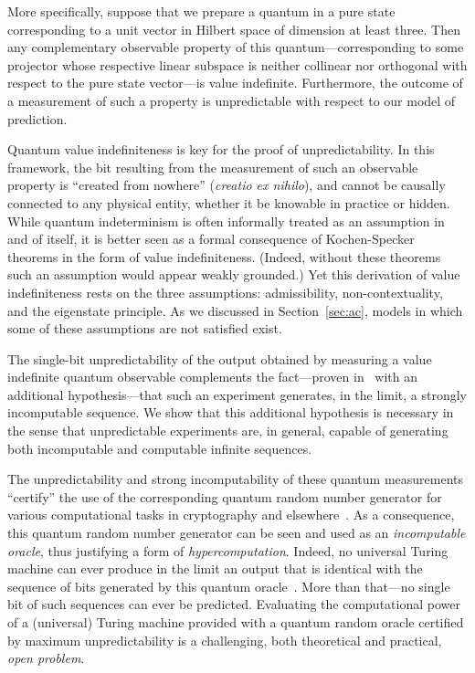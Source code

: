 \documentclass[%
 superscriptaddress,
 preprint,
 showpacs,
 showkeys,
 preprintnumbers,
 nofootinbib,
  amsmath,amssymb,
  aps,
 pra,
  longbibliography,
  floatfix,
 ]{revtex4-1}
\theoremstyle{definition}
\begin{document}
More specifically,  suppose that we prepare a quantum in a pure state corresponding to a unit vector in Hilbert space of dimension at least three.
Then any complementary observable property of this quantum---corresponding to some projector whose respective linear subspace is neither collinear nor orthogonal with respect to the pure state vector---is value indefinite.
Furthermore,  the outcome of a measurement of such a property is unpredictable with respect to our model of prediction.

Quantum value indefiniteness is key for the proof of unpredictability.
In this framework, the bit resulting from the measurement of such an observable property is ``created from nowhere'' (\emph{creatio ex nihilo}), and cannot be causally connected to any physical entity, whether it be knowable in practice or hidden.
While quantum indeterminism is often informally treated as an assumption in and of itself, it is better seen as a formal consequence of Kochen-Specker theorems in the form of value indefiniteness.
(Indeed, without these theorems such an assumption would appear weakly grounded.)
Yet this derivation of value indefiniteness rests on the three assumptions: admissibility, non-contextuality, and the eigenstate principle.
As we discussed in Section~\ref{sec:ac}, models in which some of these assumptions are not satisfied exist.

The single-bit unpredictability of the output obtained by measuring a value indefinite quantum observable 
complements the fact---proven in~\cite{2012-incomput-proofsCJ} with an additional hypothesis---that such an experiment generates, in the limit, a strongly incomputable sequence.
We show that this additional hypothesis is necessary in the sense that unpredictable experiments are, in general, capable of generating both incomputable and computable infinite sequences.


The unpredictability and strong incomputability of these quantum measurements ``certify'' the use of the corresponding quantum random number generator for various computational tasks in cryptography and elsewhere~\cite{svozil-qct,stefanov-2000,10.1038/nature09008}. As a consequence, this quantum random number generator can be seen and used as an \emph{incomputable oracle}, thus  justifying   a form of  \emph{hypercomputation}. Indeed,  no universal Turing machine can ever produce in the limit an output that is identical with the sequence of bits generated by this quantum oracle~\cite{qrand-oracle}.
More than that---no single bit of such sequences can ever be predicted. 
Evaluating the computational power of a (universal) Turing machine provided with a quantum random oracle certified by maximum unpredictability is a challenging, both theoretical and practical, {\it open problem}.
\end{document}
